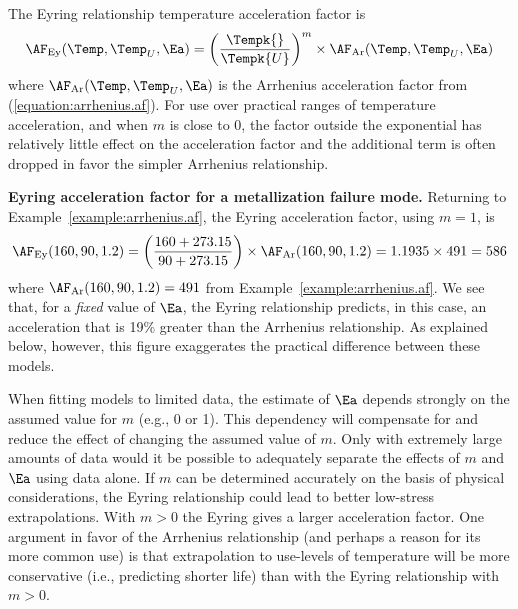 The Eyring relationship temperature acceleration factor is
\begin{displaymath}
\label{equation:eyring.af}
\AF_{\rm Ey}(\Temp,\Temp_{U},\Ea) =  
\left(\frac{\Tempk{}}{\Tempk{U}}  \right)^{m} 
\times \AF_{\rm Ar}(\Temp,\Temp_{U},\Ea)
\end{displaymath}
where $\AF_{\rm Ar}(\Temp,\Temp_{U},\Ea)$ is the Arrhenius
acceleration factor from (\ref{equation:arrhenius.af}).  For use over
practical ranges of temperature acceleration, and when $m$ is close to 0,
the factor outside the exponential has relatively little effect on
the acceleration factor and the additional term is often dropped in
favor the simpler Arrhenius relationship.

\begin{example}
{\bf Eyring acceleration factor for a metallization failure mode.}
\label{example:eyring.af}
Returning to Example~\ref{example:arrhenius.af}, the Eyring
acceleration factor, using $m=1$, is 
\begin{displaymath}
\AF_{\rm
Ey}(160,90,1.2)= \left(\frac{160+273.15}{90+273.15}\right)\times
\AF_{\rm Ar}(160,90,1.2) =
1.1935 \times 491 = 586
\end{displaymath}
where $\AF_{\rm Ar}(160,90,1.2)=491$ from
Example~\ref{example:arrhenius.af}. We see that, for a {\em fixed}
value of $\Ea$, the Eyring relationship predicts, in this case, 
an acceleration that
is 19\% greater than the Arrhenius relationship. As explained below,
however, this figure exaggerates the practical difference
between these models.
\end{example}

When fitting models to limited data, the estimate of $\Ea$ depends
strongly on the assumed value for $m$ (e.g., 0 or 1). This
dependency will compensate for and reduce the effect of changing the
assumed value of $m$. Only with extremely large amounts of data
would it be possible to adequately separate the effects of $m$ and
$\Ea$ using data alone. If $m$ can be determined accurately on the
basis of physical considerations, the Eyring relationship could lead
to better low-stress extrapolations. With $m>0$ the Eyring gives a
larger acceleration factor.  One argument in favor of the Arrhenius
relationship (and perhaps a reason for its more common use) is that
extrapolation to use-levels of temperature will be more conservative
(i.e., predicting shorter life) than with the Eyring relationship
with $m>0$.

